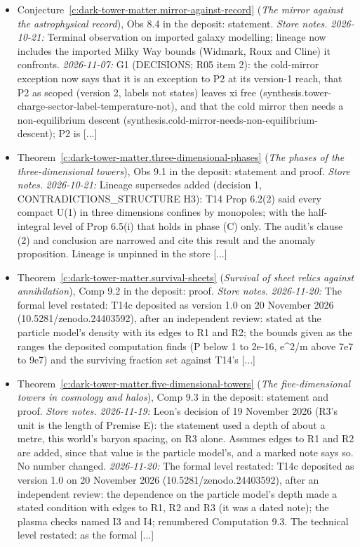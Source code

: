 \documentclass[11pt]{article}
\theoremstyle{definition}
\theoremstyle{plain}
\begin{document}
\begin{itemize}
\item Conjecture~\ref{c:dark-tower-matter.mirror-against-record} (\emph{The mirror against the astrophysical record}), Obs 8.4 in the deposit: statement. \emph{Store notes.} \emph{2026-10-21:} Terminal observation on imported galaxy modelling; lineage now includes the imported Milky Way bounds (Widmark, Roux and Cline) it confronts. \emph{2026-11-07:} G1 (DECISIONS; R05 item 2): the cold-mirror exception now says that it is an exception to P2 at its version-1 reach, that P2 as scoped (version 2, labels not states) leaves xi free (synthesis.tower-charge-sector-label-temperature-not), and that the cold mirror then needs a non-equilibrium descent (synthesis.cold-mirror-needs-non-equilibrium-descent); P2 is [...]
\item Theorem~\ref{c:dark-tower-matter.three-dimensional-phases} (\emph{The phases of the three-dimensional towers}), Obs 9.1 in the deposit: statement and proof. \emph{Store notes.} \emph{2026-10-21:} Lineage supersedes added (decision 1, CONTRADICTIONS\_STRUCTURE H3): T14 Prop 6.2(2) said every compact U(1) in three dimensions confines by monopoles; with the half-integral level of Prop 6.5(i) that holds in phase (C) only. The audit's clause (2) and conclusion are narrowed and cite this result and the anomaly proposition. Lineage is unpinned in the store [...]
\item Theorem~\ref{c:dark-tower-matter.survival-sheets} (\emph{Survival of sheet relics against annihilation}), Comp 9.2 in the deposit: proof. \emph{Store notes.} \emph{2026-11-20:} The formal level restated: T14c deposited as version 1.0 on 20 November 2026 (10.5281/zenodo.24403592), after an independent review: stated at the particle model's density with its edges to R1 and R2; the bounds given as the ranges the deposited computation finds (P below 1 to 2e-16, e\^{}2/m above 7e7 to 9e7) and the surviving fraction set against T14's [...]
\item Theorem~\ref{c:dark-tower-matter.five-dimensional-towers} (\emph{The five-dimensional towers in cosmology and halos}), Comp 9.3 in the deposit: statement and proof. \emph{Store notes.} \emph{2026-11-19:} Leon's decision of 19 November 2026 (R3's unit is the length of Premise E): the statement used a depth of about a metre, this world's baryon spacing, on R3 alone. Assumes edges to R1 and R2 are added, since that value is the particle model's, and a marked note says so. No number changed. \emph{2026-11-20:} The formal level restated: T14c deposited as version 1.0 on 20 November 2026 (10.5281/zenodo.24403592), after an independent review: the dependence on the particle model's depth made a stated condition with edges to R1, R2 and R3 (it was a dated note); the plasma checks named I3 and I4; renumbered Computation 9.3. The technical level restated: as the formal [...]

\end{itemize}
\end{document}
